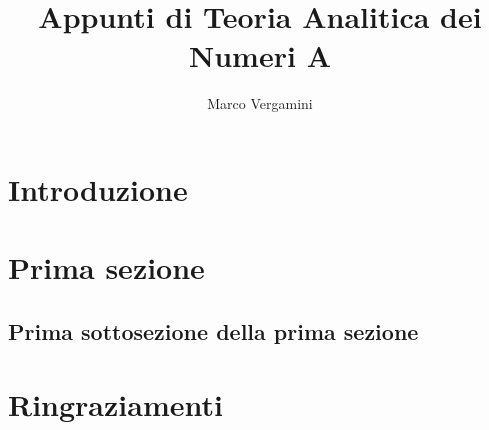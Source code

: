 \documentclass{article}
\title{Appunti di Teoria Analitica dei Numeri A}
\date{}
\author{Marco Vergamini}
\begin{document}
\maketitle
\newpage
\tableofcontents
\newpage


\section*{Introduzione}


\newpage

\section{Prima sezione}

\subsection{Prima sottosezione della prima sezione}

\newpage

\newpage



\section*{Ringraziamenti}

\end{document}
